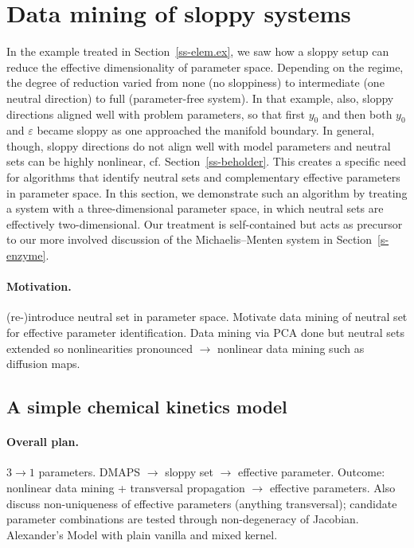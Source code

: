 \documentclass{article}
\newcommand{\eps}{\varepsilon}
\begin{document}
\section{Data mining of sloppy systems}
\label{s-data.mining}
%
In the example treated in Section~\ref{ss-elem.ex}, we saw how a sloppy setup can reduce the effective dimensionality of parameter space.
Depending on the regime, the degree of reduction varied from none (no sloppiness) to intermediate (one neutral direction) to full (parameter-free system).
In that example, also, sloppy directions aligned well with problem parameters, so that first $y_0$ and then both $y_0$ and $\eps$ became sloppy as one approached the manifold boundary.
In general, though, sloppy directions do not align well with model parameters and neutral sets can be highly nonlinear, cf. Section~\ref{ss-beholder}.
This creates a specific need for algorithms that identify neutral sets and complementary effective parameters in parameter space.
In this section, we demonstrate such an algorithm by treating a system with a three-dimensional parameter space, in which neutral sets are effectively two-dimensional.
Our treatment is self-contained but acts as precursor to our more involved discussion of the Michaelis--Menten system in Section~\ref{s-enzyme}.

{\color{gray}\paragraph{Motivation.}
(re-)introduce neutral set in parameter space.  Motivate data mining
of neutral set for effective parameter identification.  Data mining
via PCA done \cite{ADS06} but neutral sets extended so nonlinearities
pronounced $\rightarrow$ nonlinear data mining such as diffusion
maps.}



\subsection{A simple chemical kinetics model}
\label{ss-321}
%
\paragraph{Overall plan.}
$3 \rightarrow 1$ parameters. DMAPS
$\rightarrow$ sloppy set $\rightarrow$ effective parameter. Outcome:
nonlinear data mining + transversal propagation $\rightarrow$
effective parameters.  Also discuss non-uniqueness of effective
parameters (anything transversal); candidate parameter combinations
are tested through non-degeneracy of Jacobian.
Alexander's Model with plain vanilla and mixed kernel.\\
\end{document}
